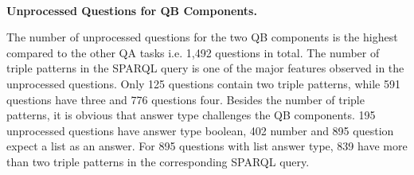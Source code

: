 \documentclass[sigconf,edbt]{acmart-edbt2019}
\begin{document}
~\\
{\bf Unprocessed Questions for QB Components.} \begin{inparaenum}
The number of unprocessed questions for the two QB components is the highest compared to the other QA tasks i.e. 1,492 questions in total. The number of triple patterns in the SPARQL query is one of the major features observed in the unprocessed questions. Only 125 questions contain two triple patterns, while 591 questions have three and 776 questions four. Besides the number of triple patterns, it is obvious that answer type challenges the QB components. 195 unprocessed questions have answer type boolean, 402 number and 895 question expect a list as an answer. For 895 questions with list answer type, 839 have more than two triple patterns in the corresponding SPARQL query. 
\end{inparaenum}

\end{document}
